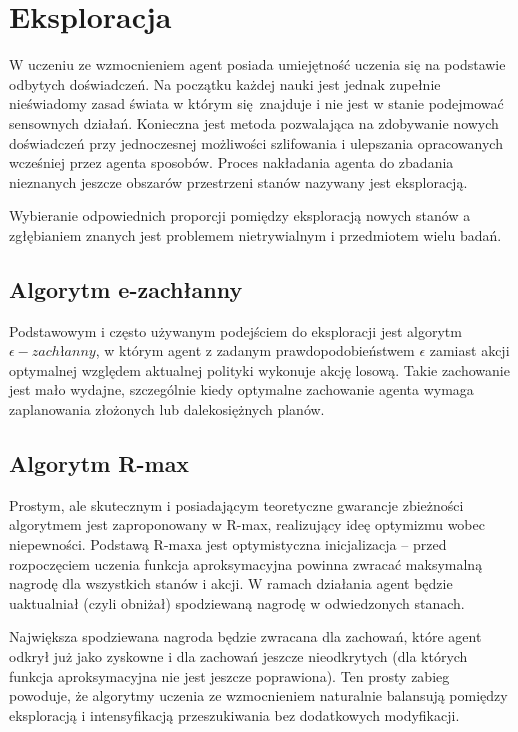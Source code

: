 \section{Eksploracja}
W uczeniu ze wzmocnieniem agent posiada umiejętność uczenia się na podstawie odbytych doświadczeń. Na początku każdej nauki jest jednak zupełnie nieświadomy zasad świata w którym się znajduje i nie jest w stanie podejmować sensownych działań. Konieczna jest metoda pozwalająca na zdobywanie nowych doświadczeń przy jednoczesnej możliwości szlifowania i ulepszania opracowanych wcześniej przez agenta sposobów. Proces nakładania agenta do zbadania nieznanych jeszcze obszarów przestrzeni stanów nazywany jest eksploracją.

Wybieranie odpowiednich proporcji pomiędzy eksploracją nowych stanów a zgłębianiem znanych jest problemem nietrywialnym i przedmiotem wielu badań.

\subsection{Algorytm e-zachłanny}\label{egreedy}
Podstawowym i często używanym podejściem do eksploracji jest algorytm $\epsilon-zachłanny$, w którym agent z zadanym prawdopodobieństwem $\epsilon$ zamiast akcji optymalnej względem aktualnej polityki wykonuje akcję losową. Takie zachowanie jest mało wydajne, szczególnie kiedy optymalne zachowanie agenta wymaga zaplanowania złożonych lub dalekosiężnych planów.

\subsection{Algorytm R-max}
Prostym, ale skutecznym i posiadającym teoretyczne gwarancje zbieżności algorytmem jest zaproponowany w \cite{brafman02} R-max, realizujący ideę optymizmu wobec niepewności. Podstawą R-maxa jest optymistyczna inicjalizacja – przed rozpoczęciem uczenia funkcja aproksymacyjna powinna zwracać maksymalną nagrodę dla wszystkich stanów i akcji. W ramach działania agent będzie uaktualniał (czyli obniżał) spodziewaną nagrodę w odwiedzonych stanach.

Największa spodziewana nagroda będzie zwracana dla zachowań, które agent odkrył już jako zyskowne i dla zachowań jeszcze nieodkrytych (dla których funkcja aproksymacyjna nie jest jeszcze poprawiona). Ten prosty zabieg powoduje, że algorytmy uczenia ze wzmocnieniem naturalnie balansują pomiędzy eksploracją i intensyfikacją przeszukiwania bez dodatkowych modyfikacji.

